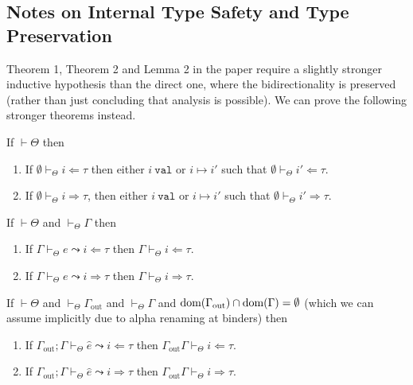 \subsection{Notes on Internal Type Safety and Type Preservation}
Theorem 1, Theorem 2 and Lemma 2 in the paper require a slightly stronger inductive hypothesis than the direct one, where the bidirectionality is preserved (rather than just concluding that analysis is possible). We can prove the following stronger theorems instead.
\newcommand{\ih}{\hat{e}}
\begin{theorem}
If $\vdash \Theta$ then
\begin{enumerate}
\item If $\emptyset \vdash_\Theta i \Leftarrow \tau$ then either $i~\mathtt{val}$ or $i \mapsto i'$ such that $\emptyset \vdash_\Theta i' \Leftarrow \tau$.
\item If $\emptyset \vdash_\Theta i \Rightarrow \tau$, then either $i~\mathtt{val}$ or $i \mapsto i'$ such that $\emptyset \vdash_\Theta i' \Rightarrow \tau$.
\end{enumerate}
\end{theorem}

\begin{theorem}
If $\vdash \Theta$ and $\vdash_\Theta \Gamma$ then
\begin{enumerate}
\item If $\Gamma \vdash_\Theta e \leadsto i \Leftarrow \tau$ then $\Gamma \vdash_\Theta i \Leftarrow \tau$.
\item If $\Gamma \vdash_\Theta e \leadsto i \Rightarrow \tau$ then $\Gamma \vdash_\Theta i \Rightarrow \tau$.
\end{enumerate}
\end{theorem}

\begin{lemma}
If $\vdash \Theta$ and $\vdash_\Theta \Gamma_{\text{out}}$ and $\vdash_\Theta \Gamma$ and $\text{dom}(\Gamma_{\text{out}}) \cap \text{dom}(\Gamma) = \emptyset$ (which we can assume implicitly due to alpha renaming at binders) then
\begin{enumerate}
\item If $\Gamma_{\text{out}}; \Gamma \vdash_\Theta \ih \leadsto i \Leftarrow \tau$ then $\Gamma_{\text{out}} \Gamma \vdash_\Theta i \Leftarrow \tau$.
\item If $\Gamma_{\text{out}}; \Gamma \vdash_\Theta \ih \leadsto i \Rightarrow \tau$ then $\Gamma_{\text{out}} \Gamma \vdash_\Theta i \Rightarrow \tau$.
\end{enumerate}
\end{lemma}
\newpage
